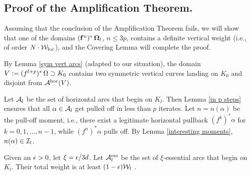 \subsection{Proof of the Amplification Theorem. }
%
%
Assuming that  the conclusion of the Amplification Theorem fails,  
we will show that one of the domains $({\mathbf{f}}^n)^*\, {\boldsymbol{{\Omega}}}_l$, $ n\leq 3p$, contains a definite vertical weight 
(i.e., of order $N\cdot {\mathcal W}_{\mathrm{loc}}$), and the Covering Lemma will complete the proof. 




By Lemma \ref{sym vert arcs} (adapted to our situation), the domain 
$V:= ( f^{l+p})^*\, {\Omega} \supset K_0$ \note{!} 
contains two symmetric vertical curves
landing on $K_0$ and disjoint from ${\mathcal A}^{\mathrm {hor}}(V)$. 

Let ${\mathcal A}_l$ be the set of horizontal  arcs that begin on $K_l$.  
Then Lemma \ref{in p steps} ensures that all $\alpha\in {\mathcal A}_l$
get pulled off in less than $p$ iterates.  
Let $n=n(\alpha)$ be the pull-off moment, i.e.,
there exist a legitimate horizontal pullback $(f^k)^*\alpha $  for $k=0,1,\dots , n-1$, 
while  $(f^n)^* \alpha$ pulls off. 
By  Lemma  \ref{interesting moments},
 $n(\alpha) \in {\mathcal I}_l$.  


 Given an ${\epsilon}>0$, let $\xi={\epsilon}/3d$. 
Let ${\mathcal A}_l^{\mathrm{ess}}$ be the set of $\xi$-essential arcs that begin on
$K_l$.  Their total weight is at least $(1-{\epsilon}){\mathcal W}_l$ . 


